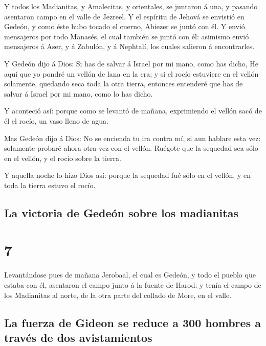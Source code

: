  Y todos los Madianitas, y Amalecitas, y orientales, se
juntaron á una, y pasando asentaron campo en el valle de Jezreel.
 Y el espíritu de Jehová se envistió en Gedeón, y como
éste hubo tocado el cuerno, Abiezer se juntó con él.  Y
envió mensajeros por todo Manasés, el cual también se juntó con él:
asimismo envió mensajeros á Aser, y á Zabulón, y á Nephtalí, los cuales
salieron á encontrarles.

 Y Gedeón dijo á Dios: Si has de salvar á Israel por mi
mano, como has dicho,  He aquí que yo pondré un vellón de
lana en la era; y si el rocío estuviere en el vellón solamente, quedando
seca toda la otra tierra, entonces entenderé que has de salvar á Israel
por mi mano, como lo has dicho.

 Y aconteció así: porque como se levantó de mañana,
exprimiendo el vellón sacó de él el rocío, un vaso lleno de agua.

 Mas Gedeón dijo á Dios: No se encienda tu ira contra mí,
si aun hablare esta vez: solamente probaré ahora otra vez con el vellón.
Ruégote que la sequedad sea sólo en el vellón, y el rocío sobre la
tierra.

 Y aquella noche lo hizo Dios así: porque la sequedad fué
sólo en el vellón, y en toda la tierra estuvo el rocío.

\hypertarget{la-victoria-de-gedeuxf3n-sobre-los-madianitas}{%
\subsection{La victoria de Gedeón sobre los
madianitas}\label{la-victoria-de-gedeuxf3n-sobre-los-madianitas}}

\hypertarget{section-07-7}{%
\section{7}\label{section-07-7}}

 Levantándose pues de mañana Jerobaal, el cual es Gedeón,
y todo el pueblo que estaba con él, asentaron el campo junto á la fuente
de Harod: y tenía el campo de los Madianitas al norte, de la otra parte
del collado de More, en el valle.

\hypertarget{la-fuerza-de-gideon-se-reduce-a-300-hombres-a-travuxe9s-de-dos-avistamientos}{%
\subsection{La fuerza de Gideon se reduce a 300 hombres a través de dos
avistamientos}\label{la-fuerza-de-gideon-se-reduce-a-300-hombres-a-travuxe9s-de-dos-avistamientos}}

